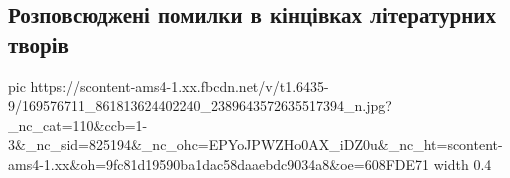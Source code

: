  
 
 
 
 

\subsection{Розповсюджені помилки в кінцівках літературних творів}


\ifcmt
  pic https://scontent-ams4-1.xx.fbcdn.net/v/t1.6435-9/169576711_861813624402240_2389643572635517394_n.jpg?_nc_cat=110&ccb=1-3&_nc_sid=825194&_nc_ohc=EPYoJPWZHo0AX_iDZ0u&_nc_ht=scontent-ams4-1.xx&oh=9fc81d19590ba1dac58daaebdc9034a8&oe=608FDE71
  width 0.4
\fi


